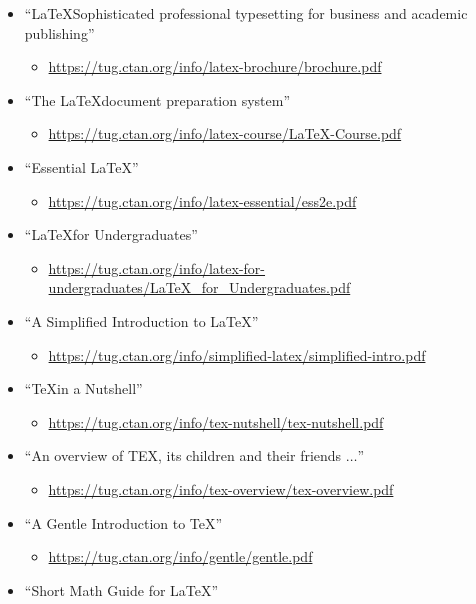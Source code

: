 \documentclass{article}
\begin{document}
 \begin{itemize}
  \item ``\LaTeX Sophisticated professional typesetting for business and
	academic publishing''
	\begin{itemize}
	 \item \url{https://tug.ctan.org/info/latex-brochure/brochure.pdf}
	\end{itemize}
  \item ``The \LaTeX document preparation system''
	\begin{itemize}
	 \item \url{https://tug.ctan.org/info/latex-course/LaTeX-Course.pdf}
	\end{itemize}
  \item ``Essential \LaTeX''
	\begin{itemize}
	 \item \url{https://tug.ctan.org/info/latex-essential/ess2e.pdf}
	\end{itemize}
  \item ``\LaTeX for Undergraduates''
	\begin{itemize}
	 \item \url{https://tug.ctan.org/info/latex-for-undergraduates/LaTeX_for_Undergraduates.pdf}
	\end{itemize}
  \item ``A Simplified Introduction to \LaTeX''
	\begin{itemize}
	 \item \url{https://tug.ctan.org/info/simplified-latex/simplified-intro.pdf}
	\end{itemize}
  \item ``\TeX in a Nutshell''
	\begin{itemize}
	 \item \url{https://tug.ctan.org/info/tex-nutshell/tex-nutshell.pdf}
	\end{itemize}
  \item ``An overview of TEX, its children and their friends $\ldots$''
       \begin{itemize}
	\item \url{https://tug.ctan.org/info/tex-overview/tex-overview.pdf}
       \end{itemize}
  \item ``A Gentle Introduction to \TeX''
	\begin{itemize}
	 \item \url{https://tug.ctan.org/info/gentle/gentle.pdf}
	\end{itemize}
  \item ``Short Math Guide for \LaTeX''

\end{itemize}
\end{document}
